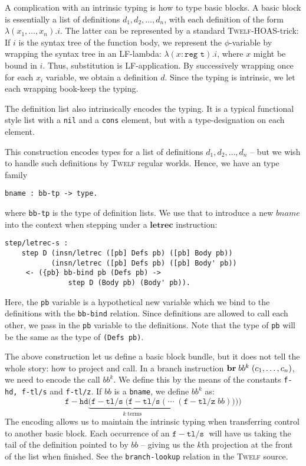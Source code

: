 \documentclass[a4paper, oneside, 10pt, draft]{memoir}
\newcommand{\twelf}{\textsc{Twelf}}
\begin{document}
A complication with an intrinsic typing is how to type basic blocks. A
basic block is essentially a list of definitions $d_1, d_2, \dotsc,
d_n$, with each definition of the form $\lambda (x_1, \dotsc,
x_n).i$. The latter can be represented by a standard \twelf{}-HOAS-trick:
If $i$ is the syntax tree of the function body, we represent the
$\phi$-variable by wrapping the syntax tree in an LF-lambda: $\lambda
(x : \texttt{reg t}) . i$, where $x$ might be bound in $i$. Thus,
substitution is LF-application. By successively wrapping once for each
$x_i$ variable, we obtain a definition $d$. Since the typing is
intrinsic, we let each wrapping book-keep the typing.

The definition list also intrinsically encodes the typing. It is a
typical functional style list with a \texttt{nil} and a \texttt{cons}
element, but with a type-designation on each element.

This construction encodes types for a list of definitions $d_1, d_2,
\dotsc, d_n$ -- but we wish to handle such definitions by \twelf{}
regular worlds. Hence, we have an type family
\begin{verbatim}
bname : bb-tp -> type.
\end{verbatim}
where \texttt{bb-tp} is the type of definition lists. We use that to
introduce a new $bname$ into the context when stepping under a
$\mathbf{letrec}$ instruction:
\begin{verbatim}
step/letrec-s :
    step D (insn/letrec ([pb] Defs pb) ([pb] Body pb))
           (insn/letrec ([pb] Defs pb) ([pb] Body' pb))
     <- ({pb} bb-bind pb (Defs pb) ->
               step D (Body pb) (Body' pb)).
\end{verbatim}
Here, the \texttt{pb} variable is a hypothetical new variable which we
bind to the definitions with the \texttt{bb-bind} relation. Since
definitions are allowed to call each other, we pass in the \texttt{pb}
variable to the definitions. Note that the type of \texttt{pb} will be
the same as the type of \texttt{(Defs pb)}.

The above construction let us define a basic block bundle, but it does
not tell the whole story: how to project and call. In a branch
instruction $\mathbf{br} \; bb^k \; (c_1, \dotsc, c_n)$, we need to encode the
call $bb^k$. We define this by the means of the constants
\texttt{f-hd, f-tl/s} and \texttt{f-tl/z}. If $bb$ is a
\texttt{bname}, we define $bb^k$ as:
\newcommand{\fhd}{\mathtt{f\!\!-\!\!hd}}
\newcommand{\ftls}{\mathtt{f\!\!-\!\!tl/s}\; }
\newcommand{\ftlz}[1]{(\mathtt{f\!\!-\!\!tl/z} \; #1)}
\begin{equation*}
  \fhd \underbrace{(\ftls(\ftls ( \; \dotsb \; }_{k \; \text{terms}}\ftlz{bb})))
\end{equation*}
The encoding allows us to maintain the intrinsic typing when transferring
control to another basic block. Each occurrence of an $\ftls$ will
have us taking the tail of the definition pointed to by $bb$ -- giving
us the $k$th projection at the front of the list when finished. See
the \texttt{branch-lookup} relation in the \twelf{} source.
\end{document}
